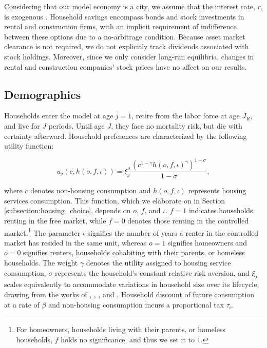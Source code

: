 \documentclass[parskip=full]{article}
\begin{document}
Considering that our model economy is a city, we assume that the interest rate, $r$, is exogenous \citep{sommeretal-2013, arslanetal-2015, sommersullivan-2017, kaplanetal-2019}. Household savings encompass bonds and stock investments in rental and construction firms, with an implicit requirement of indifference between these options due to a no-arbitrage condition. Because asset market clearance is not required, we do not explicitly track dividends associated with stock holdings. Moreover, since we only consider long-run equilibria, changes in rental and construction companies' stock prices have no affect on our results.

\subsection{Demographics}\label{subsection:demographics}

Households enter the model at age $j=1$, retire from the labor force at age $J_{R}$, and live for $J$ periods. Until age $J$, they face no mortality risk, but die with certainty afterward. Household preferences are characterized by the following utility function:

\begin{equation*}
    u_{j}(c,h(o,f,\iota))=\xi_{j}^{\sigma}\frac{\left(c^{1-\gamma} h(o,f,\iota)^{\gamma}\right)^{1-\sigma}}{1-\sigma},
\end{equation*}

\noindent where $c$ denotes non-housing consumption and $h(o,f,\iota)$ represents housing services consumption. This function, which we elaborate on in Section \ref{subsection:housing_choice}, depends on $o$, $f$, and $\iota$. $f=1$ indicates households renting in the free market, while $f=0$ denotes those renting in the controlled market.\footnote{For homeowners, households living with their parents, or homeless households, $f$ holds no significance, and thus we set it to $1$.} The parameter $\iota$ signifies the number of years a renter in the controlled market has resided in the same unit, whereas $o=1$ signifies homeowners and $o=0$ signifies renters, households cohabiting with their parents, or homeless households. The weight $\gamma$ denotes the utility assigned to housing service consumption, $\sigma$ represents the household's constant relative risk aversion, and $\xi_{j}$ scales equivalently to accommodate variations in household size over its lifecycle, drawing from the works of \citet{lm-1980}, \citet{wz-2010}, \citet{xu-2013}, and \citet{rs-2023}. Household discount of future consumption at a rate of $\beta$ and non-housing consumption incurs a proportional tax $\tau_{c}$.
\end{document}

